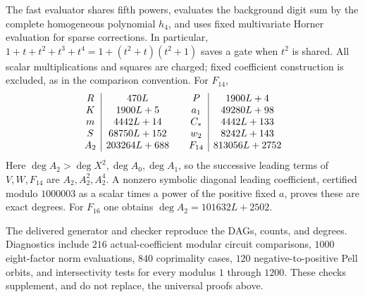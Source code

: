 The fast evaluator shares fifth powers, evaluates the background digit
sum by the complete homogeneous polynomial $h_4$, and uses fixed
multivariate Horner evaluation for sparse corrections. In particular,
$1+t+t^2+t^3+t^4=1+(t^2+t)(t^2+1)$ saves a gate when $t^2$ is shared.
All scalar multiplications and squares are charged; fixed coefficient
construction is excluded, as in the comparison convention.
For $F_{14}$,
\[
\begin{array}{c|c@{\qquad}c|c}
 R&470L&P&1900L+4\\
 K&1900L+5&a_1&49280L+98\\
 m&4442L+14&C_*&4442L+133\\
 S&68750L+152&w_2&8242L+143\\
 A_2&203264L+688&F_{14}&813056L+2752
\end{array}
\]
Here $\deg A_2>\deg X^2,\deg A_0,\deg A_1$, so the successive
leading terms of $V,W,F_{14}$ are $A_2,A_2^2,A_2^4$.
A nonzero symbolic diagonal leading coefficient, certified modulo
$1000003$ as a scalar times a power of the positive fixed $a$, proves
these are exact degrees. For $F_{16}$ one obtains
$\deg A_2=101632L+2502$.

The delivered generator and checker reproduce the DAGs, counts, and
degrees. Diagnostics include $216$ actual-coefficient modular circuit
comparisons, $1000$ eight-factor norm evaluations, $840$ coprimality
cases, $120$ negative-to-positive Pell orbits, and intersectivity tests
for every modulus $1$ through $1200$. These checks supplement, and do
not replace, the universal proofs above.
